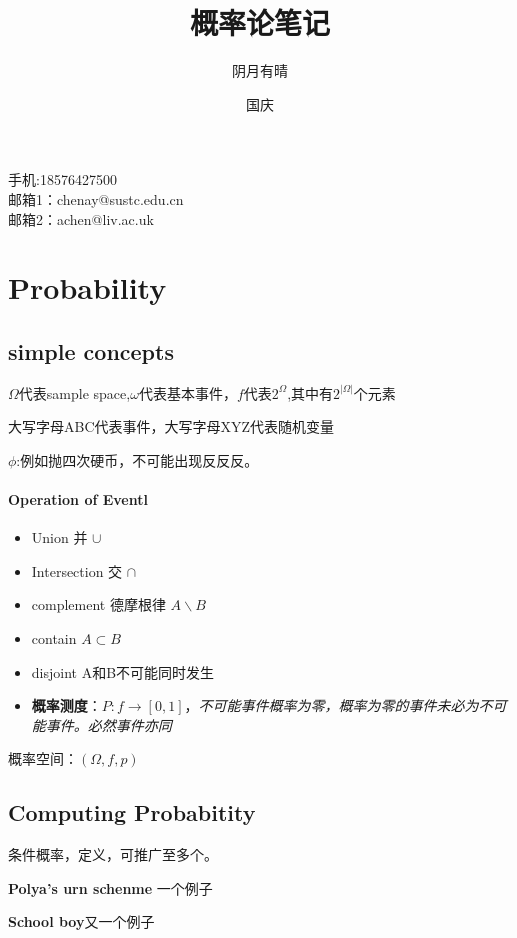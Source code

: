\documentclass[12pt,a4paper]{ctexart}
\author{阴月有晴}
\title{概率论笔记}
\date{国庆}
\begin{document}
\maketitle
\begin{center}
手机:18576427500\\
邮箱1：chenay@sustc.edu.cn\\
邮箱2：achen@liv.ac.uk
\end{center}
\tableofcontents

\section{Probability}
\subsection{simple concepts}
$ \Omega  $代表sample space,$ \omega  $代表基本事件，$ f $代表$ 2^{\Omega} $,其中有$ 2^{\left| \Omega \right|} $个元素

大写字母ABC代表事件，大写字母XYZ代表随机变量

$ \phi $:例如抛四次硬币，不可能出现反反反。

\paragraph{Operation of Eventl}
\begin{itemize}
	\item Union 并 $ \cup $
	\item Intersection 交 $ \cap $
	\item complement 德摩根律  $ A \backslash B $ 
	\item contain $ A \subset B $
	\item disjoint A和B不可能同时发生
	\item \textbf{概率测度}：$ P:f\rightarrow \left[ 0,1\right]  $，\textit{不可能事件概率为零，概率为零的事件未必为不可能事件。必然事件亦同}
\end{itemize}

概率空间：$ \left( \Omega,f,p\right)  $

\subsection{Computing Probabitity}
条件概率，定义，可推广至多个。

\textbf{Polya's urn schenme} 一个例子

\textbf{School boy}又一个例子
\end{document}
